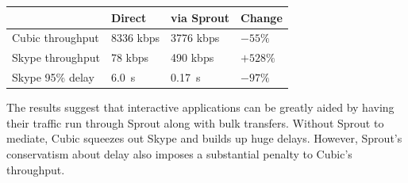 \begin{center}
{
\small
\noindent \begin{tabular}{|l|l|l|l|}
\hline
& Direct & via Sprout & Change \\
\hline
\hline
Cubic throughput & 8336 kbps & 3776 kbps & \cellcolor{red!20}$-55\%$ \\
Skype throughput & 78 kbps & 490 kbps & \cellcolor{blue!20}$+528\%$ \\
Skype 95\% delay & 6.0~s & 0.17~s & \cellcolor{blue!20}$-97\%$ \\
\hline
\end{tabular}
}
\end{center}

The results suggest that interactive applications can be
greatly aided by having their traffic run through Sprout along
with bulk transfers. Without Sprout to mediate, Cubic squeezes
out Skype and builds up huge delays. However, Sprout's conservatism about
delay also imposes a substantial penalty to Cubic's throughput.

\vspace{\baselineskip}








